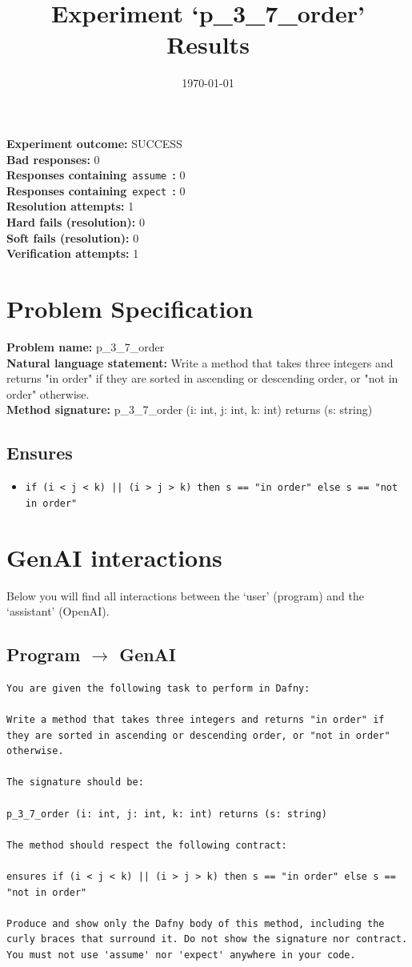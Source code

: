 \documentclass{article}
\begin{document}
\title{Experiment `p\_3\_7\_order' Results}
\author{\today}
\date{}
\maketitle
\textbf{Experiment outcome: }SUCCESS
\\\textbf{Bad responses: }0
\\\textbf{Responses containing}~\texttt{assume}~\textbf{: }0
\\\textbf{Responses containing}~\texttt{expect}~\textbf{: }0
\\\textbf{Resolution attempts: }1
\\\textbf{Hard fails (resolution): }0
\\\textbf{Soft fails (resolution): }0
\\\textbf{Verification attempts: }1
\section*{Problem Specification}
\textbf{Problem name: }p\_3\_7\_order
\\\textbf{Natural language statement: }Write a method that takes three integers and returns "in order" if they are sorted in ascending or descending order, or "not in order" otherwise.
\\\textbf{Method signature: }p\_3\_7\_order (i: int, j: int, k: int) returns (s: string)
\subsection*{Ensures}
\begin{itemize}
\item \texttt{if (i < j < k) || (i > j > k) then s == "in order" else s == "not in order"}
\end{itemize}
\clearpage
\section*{GenAI interactions}
Below you will find all interactions between the `user' (program) and the `assistant' (OpenAI).
\subsection*{Program $\rightarrow$ GenAI}
\begin{lstlisting}
You are given the following task to perform in Dafny:

Write a method that takes three integers and returns "in order" if they are sorted in ascending or descending order, or "not in order" otherwise.

The signature should be:

p_3_7_order (i: int, j: int, k: int) returns (s: string)

The method should respect the following contract:

ensures if (i < j < k) || (i > j > k) then s == "in order" else s == "not in order"

Produce and show only the Dafny body of this method, including the curly braces that surround it. Do not show the signature nor contract. You must not use 'assume' nor 'expect' anywhere in your code.
\end{lstlisting}
\end{document}
